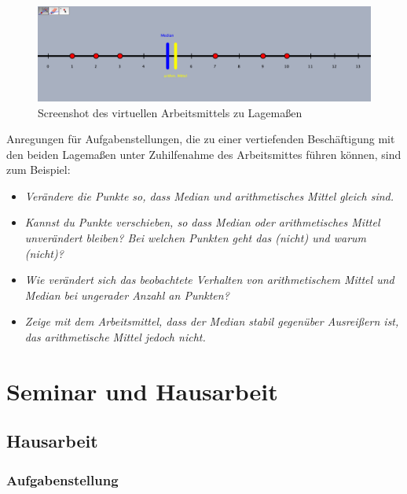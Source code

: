 \documentclass[
  ngerman,
]{scrbook}
\providecommand{\tightlist}{%
  \setlength{\itemsep}{0pt}\setlength{\parskip}{0pt}}
\theoremstyle{definition}
\theoremstyle{definition}
\theoremstyle{definition}
\theoremstyle{definition}
\theoremstyle{remark}
\begin{document}
\begin{figure}

{\centering \includegraphics[width=0.75\linewidth]{pictures/E-ScreenshotLagemass} 

}

\caption{Screenshot des virtuellen Arbeitsmittels zu Lagemaßen}\label{fig:ScreenshotLagemass}
\end{figure}

Anregungen für Aufgabenstellungen, die zu einer vertiefenden Beschäftigung mit den beiden Lagemaßen unter Zuhilfenahme des Arbeitsmittes führen können, sind zum Beispiel:

\begin{itemize}
\tightlist
\item
  \emph{Verändere die Punkte so, dass Median und arithmetisches Mittel gleich sind.}
\item
  \emph{Kannst du Punkte verschieben, so dass Median oder arithmetisches Mittel unverändert bleiben? Bei welchen Punkten geht das (nicht) und warum (nicht)?}
\item
  \emph{Wie verändert sich das beobachtete Verhalten von arithmetischem Mittel und Median bei ungerader Anzahl an Punkten?}
\item
  \emph{Zeige mit dem Arbeitsmittel, dass der Median stabil gegenüber Ausreißern ist, das arithmetische Mittel jedoch nicht.}
\end{itemize}

\hypertarget{seminar-und-hausarbeit}{%
\chapter{Seminar und Hausarbeit}\label{seminar-und-hausarbeit}}

\hypertarget{hausarbeit}{%
\section{Hausarbeit}\label{hausarbeit}}

\hypertarget{aufgabenstellung}{%
\subsection{Aufgabenstellung}\label{aufgabenstellung}}
\end{document}
